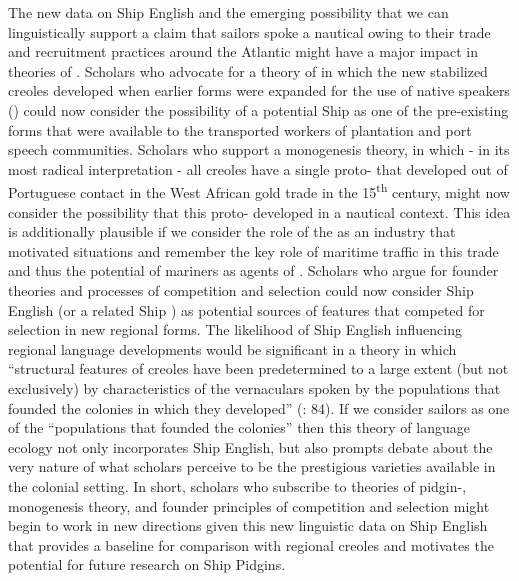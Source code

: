 The new data on Ship English and the emerging possibility that we can linguistically support a claim that sailors spoke a nautical  owing to their trade and recruitment practices around the Atlantic might have a major impact in theories of . Scholars who advocate for a theory of  in which the new stabilized creoles developed when earlier  forms were expanded for the use of native speakers (\citealt{Holm1988}) could now consider the possibility of a potential Ship  as one of the pre-existing forms that were available to the transported workers of plantation and port speech communities. Scholars who support a monogenesis theory, in which - in its most radical interpretation - all creoles have a single proto- that developed out of Portuguese contact in the West African gold trade in the 15\textsuperscript{th} century, might now consider the possibility that this proto- developed in a nautical context. This idea is additionally plausible if we consider the role of the  as an industry that motivated  situations and remember the key role of maritime traffic in this trade and thus the potential of mariners as agents of . Scholars who argue for founder theories and processes of competition and selection \citep{Mufwene1996} could now consider Ship English (or a related Ship ) as potential sources of features that competed for selection in new regional forms. The likelihood of Ship English influencing regional language developments would be significant in a theory in which “structural features of creoles have been predetermined to a large extent (but not exclusively) by characteristics of the vernaculars spoken by the populations that founded the colonies in which they developed” (\citealt{Mufwene1996}: 84). If we consider sailors as one of the “populations that founded the colonies” then this theory of language ecology not only incorporates Ship English, but also prompts debate about the very nature of what scholars perceive to be the prestigious  varieties available in the colonial setting. In short, scholars who subscribe to theories of pidgin-, monogenesis theory, and founder principles of competition and selection might begin to work in new directions given this new linguistic data on Ship English that provides a baseline for comparison with regional creoles and motivates the potential for future research on Ship Pidgins. 

